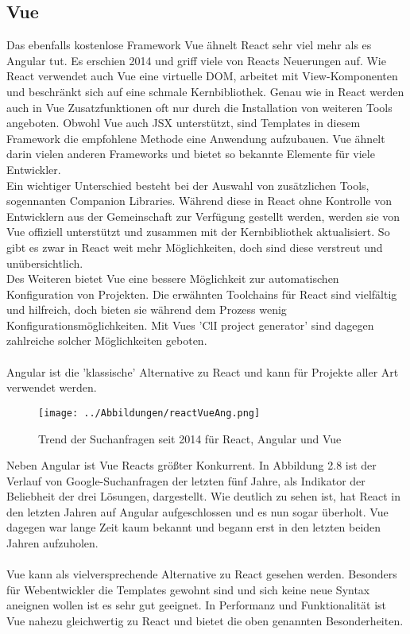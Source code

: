 \subsection{Vue}
Das ebenfalls kostenlose Framework Vue ähnelt React sehr viel mehr als es Angular tut. Es erschien 2014 und griff viele von Reacts Neuerungen auf. Wie React verwendet auch Vue eine virtuelle DOM, arbeitet mit View-Komponenten und beschränkt sich auf eine schmale Kernbibliothek. Genau wie in React werden auch in Vue Zusatzfunktionen oft nur durch die Installation von weiteren Tools angeboten. Obwohl Vue auch JSX unterstützt, sind Templates in diesem Framework die empfohlene Methode eine Anwendung aufzubauen. Vue ähnelt darin vielen anderen Frameworks und bietet so bekannte Elemente für viele Entwickler. \\
Ein wichtiger Unterschied besteht bei der Auswahl von zusätzlichen Tools, sogennanten Companion Libraries. Während diese in React ohne Kontrolle von Entwicklern aus der Gemeinschaft zur Verfügung gestellt werden, werden sie von Vue offiziell unterstützt und zusammen mit der Kernbibliothek aktualisiert. So gibt es zwar in React weit mehr Möglichkeiten, doch sind diese verstreut und unübersichtlich.\\
Des Weiteren bietet Vue eine bessere Möglichkeit zur automatischen Konfiguration von Projekten. Die erwähnten Toolchains für React sind vielfältig und hilfreich, doch bieten sie während dem Prozess wenig Konfigurationsmöglichkeiten. Mit Vues 'ClI project generator' sind dagegen zahlreiche solcher Möglichkeiten geboten.  \\\\
Angular ist die 'klassische' Alternative zu React und kann für Projekte aller Art verwendet werden.
\begin{figure}[!thb]
     \centerline{\texttt{[image: ../Abbildungen/reactVueAng.png]}}
  \caption{Trend der Suchanfragen seit 2014 für React, Angular und Vue \cite{react}}
  \label{Trend der Suchanfragen}
\end{figure}
Neben Angular ist Vue Reacts größter Konkurrent. In Abbildung 2.8 ist der Verlauf von Google-Suchanfragen der letzten fünf Jahre, als Indikator der Beliebheit der drei Lösungen, dargestellt. Wie deutlich zu sehen ist, hat React in den letzten Jahren auf Angular aufgeschlossen und es nun sogar überholt. Vue dagegen war lange Zeit kaum bekannt und begann erst in den letzten beiden Jahren aufzuholen.\\\\ 
Vue kann als vielversprechende Alternative zu React gesehen werden. Besonders für Webentwickler die Templates gewohnt sind und sich keine neue Syntax aneignen wollen ist es sehr gut geeignet. In Performanz und Funktionalität ist Vue nahezu gleichwertig zu React und bietet die oben genannten Besonderheiten.
